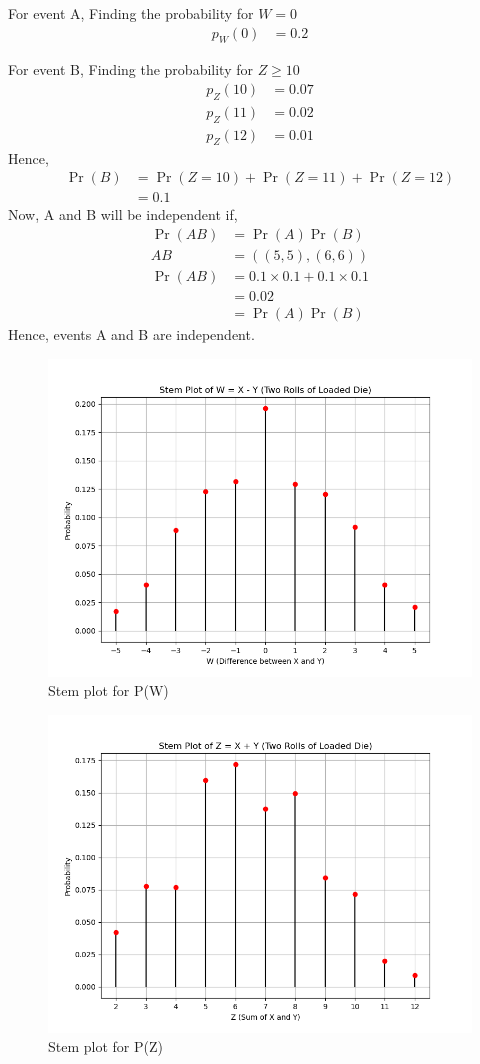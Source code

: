 \documentclass[]{article}
\begin{document}
For event A,
Finding the probability for $W = 0$
\begin{align}
	p_W(0) &= 0.2 
\end{align}

For event B,
Finding the probability for $Z\geq 10$
\begin{align}
p_Z(10) &= 0.07\\
p_Z(11) &= 0.02\\
p_Z(12) &= 0.01
\end{align}
Hence,
\begin{align}
\Pr(B) &= \Pr(Z=10) + \Pr(Z=11) + \Pr(Z=12)\\
&= 0.1
\end{align}
Now, A and B will be independent if,
\begin{align}
\Pr(AB) &= \Pr(A)\Pr(B)\\
AB &= ((5,5), (6,6)) \\
\Pr(AB) &= 0.1 \times 0.1 + 0.1 \times 0.1\\
&= 0.02\\
&= \Pr(A)\Pr(B)
\end{align}
Hence, events A and B are independent.
\begin{figure}
\includegraphics[width=\columnwidth]{./exemplar/12/13/3/1/figs/W.png}
\caption{Stem plot for P(W)}
\label{fig:exemplar/12/13/3/1/W/}
\end{figure}
\begin{figure}
\includegraphics[width=\columnwidth]{./exemplar/12/13/3/1/figs/Z.png}
\caption{Stem plot for P(Z)}
\label{fig:exemplar/12/13/3/1/Z/}
\end{figure}
\end{document}
